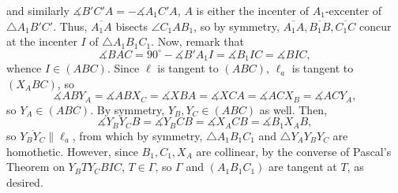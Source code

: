 and similarly $\measuredangle B'C'A=-\measuredangle A_1C'A$, $A$ is either the incenter of $A_1$-excenter of $\triangle A_1B'C'$. Thus, $\overline{A_1A}$ bisects $\angle C_1AB_1$, so by symmetry, $\overline{A_1A},\overline{B_1B},\overline{C_1C}$ concur at the incenter $I$ of $\triangle A_1B_1C_1$. Now, remark that \[\measuredangle BAC=90^\circ-\measuredangle B'A_1I=\measuredangle B_1IC=\measuredangle BIC,\]
whence $I\in(ABC)$. Since $\ell$ is tangent to $(ABC)$, $\ell_a$ is tangent to $(X_ABC)$, so \[\measuredangle ABY_A=\measuredangle ABX_C=\measuredangle XBA=\measuredangle XCA=\measuredangle ACX_B=\measuredangle ACY_A,\]
so $Y_A\in(ABC)$. By symmetry, $Y_B,Y_C\in(ABC)$ as well. Then, \[\measuredangle Y_BY_CB=\measuredangle Y_BCB=\measuredangle X_ACB=\measuredangle B_1X_AB,\]
so $\overline{Y_BY_C}\parallel\ell_a$, from which by symmetry, $\triangle A_1B_1C_1$ and $\triangle Y_AY_BY_C$ are homothetic. However, since $B_1,C_1,X_A$ are collinear, by the converse of Pascal's Theorem on $Y_BTY_CBIC$, $T\in\Gamma$, so $\Gamma$ and $(A_1B_1C_1)$ are tangent at $T$, as desired. 

